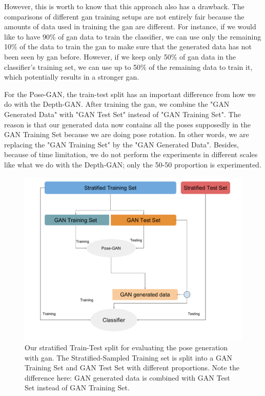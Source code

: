 However, this is worth to know that this approach also has a drawback. The comparisons of
different \acrshort{gan} training setups are not entirely fair because the amounts of data
used in training the \acrshort{gan} are different. For instance, if we would like to have
90\% of \acrshort{gan} data to train the classifier, we can use only the remaining 10\% of
the data to train the \acrshort{gan} to make sure that the generated data has not been
seen by \acrshort{gan} before. However, if we keep only 50\% of \acrshort{gan} data in the
classifier's training set, we can use up to 50\% of the remaining data to train it, which
potentially results in a stronger \acrshort{gan}. 

For the Pose-GAN, the train-test split has an important difference from how we do with the
Depth-GAN. After training the \acrshort{gan}, we combine the "GAN Generated Data" with "GAN
Test Set" instead of "GAN Training Set". The reason is that our generated data now
contains all the poses supposedly in the GAN Training Set because we are doing pose
rotation. In other words, we are replacing the "GAN Training Set" by the "GAN Generated
Data". Besides, because of time limitation, we do not perform the experiments in different
scales like what we do with the Depth-GAN; only the 50-50 proportion is experimented.

\begin{figure}[h]
	\centering
	\includegraphics[width=\linewidth]{img/gan_train_test_split_pose}
	\caption{Our stratified Train-Test split for evaluating the pose generation with
		\acrshort{gan}. The Stratified-Sampled Training set is split into a GAN Training
		Set and GAN Test Set with different proportions. Note the difference here: GAN
	generated data is combined with GAN Test Set instead of GAN Training Set.}
	\label{fig:gan_train_test_split_pose}
\end{figure}
